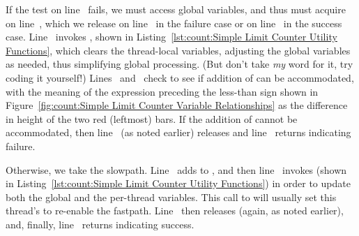 \begin{fcvref}
If the test on
line~ fails, we must access global variables, and thus
must acquire  on
line~, which we release on line~
in the failure case or on line~ in the success case.
Line~ invokes , shown in
Listing~\ref{lst:count:Simple Limit Counter Utility Functions},
which clears the thread-local variables, adjusting the global variables
as needed, thus simplifying global processing.
(But don't take \emph{my} word for it, try coding it yourself!)
Lines~ and~ check to see
if addition of  can be accommodated,
with the meaning of the expression preceding the less-than sign shown in
Figure~\ref{fig:count:Simple Limit Counter Variable Relationships}
as the difference in height of the two red (leftmost) bars.
If the addition of  cannot be accommodated, then
line~ (as noted earlier) releases  and
line~
returns indicating failure.

Otherwise, we take the slowpath.
Line~ adds  to , and then
line~ invokes  (shown in
Listing~\ref{lst:count:Simple Limit Counter Utility Functions})
in order to update both the global and the per-thread variables.
This call to 
will usually set this thread's  to re-enable the fastpath.
Line~ then releases
 (again, as noted earlier), and, finally,
line~ returns indicating success.
\end{fcvref}

\QuickQuizEnd

